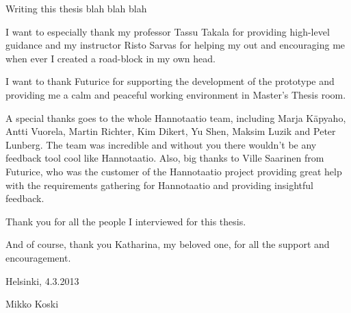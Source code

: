 \documentclass[english,12pt,a4paper,pdftex]{article}
\begin{document}


Writing this thesis blah blah blah

I want to especially thank my professor Tassu Takala for providing high-level guidance and my instructor Risto Sarvas for helping my out and encouraging me when ever I created a road-block in my own head.

I want to thank Futurice for supporting the development of the prototype and providing me a calm and peaceful working environment in Master's Thesis room.

A special thanks goes to the whole Hannotaatio team, including Marja Käpyaho, Antti Vuorela, Martin Richter, Kim Dikert, Yu Shen, Maksim Luzik and Peter Lunberg. The team was incredible and without you there wouldn't be any feedback tool cool like Hannotaatio. Also, big thanks to Ville Saarinen from Futurice, who was the customer of the Hannotaatio project providing great help with the requirements gathering for Hannotaatio and providing insightful feedback.

Thank you for all the people I interviewed for this thesis.

And of course, thank you Katharina, my beloved one, for all the support and encouragement.

\vspace{5cm}
Helsinki, 4.3.2013

\vspace{5mm}
{\hfill Mikko Koski \hspace{1cm}}

\newpage




\tableofcontents
\end{document}

